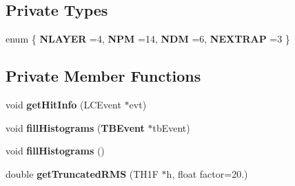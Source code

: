 \subsection*{Private Types}
\begin{DoxyCompactItemize}
\item 
enum \{ {\bfseries N\-L\-A\-Y\-E\-R} =4, 
{\bfseries N\-P\-M} =14, 
{\bfseries N\-D\-M} =6, 
{\bfseries N\-E\-X\-T\-R\-A\-P} =3
 \}
\end{DoxyCompactItemize}
\subsection*{Private Member Functions}
\begin{DoxyCompactItemize}
\item 
void {\bfseries get\-Hit\-Info} (L\-C\-Event $\ast$evt)\label{classTBTrackScatter_ab1ea6e233c8bb77220d359f12a9c9157}

\item 
void {\bfseries fill\-Histograms} ({\bf T\-B\-Event} $\ast$tb\-Event)\label{classTBTrackScatter_a640bc27626ee6e00e65c38065a2d358a}

\item 
void {\bfseries fill\-Histograms} ()\label{classTBTrackScatter_ab72d09b02640fe451b58f87989b6b6bc}

\item 
double {\bfseries get\-Truncated\-R\-M\-S} (T\-H1\-F $\ast$h, float factor=20.)\label{classTBTrackScatter_aece42b823239fe34a46c3497718acb76}

\end{DoxyCompactItemize}

